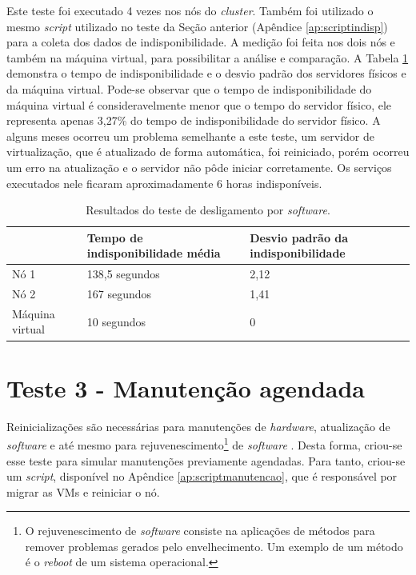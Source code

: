 Este teste foi executado 4 vezes nos nós do \textit{cluster}. Também foi utilizado o mesmo \textit{script} utilizado no teste da Seção anterior
(Apêndice \ref{ap:scriptindisp}) para a coleta dos dados de indisponibilidade. A medição foi feita nos dois nós e também na máquina virtual, para
possibilitar a análise e comparação.
A Tabela \ref{tab:teste2resultados} demonstra o tempo de indisponibilidade e o desvio padrão dos servidores físicos e da máquina virtual.
Pode-se observar que o tempo de indisponibilidade do máquina virtual é consideravelmente menor que o tempo do servidor físico, ele representa 
apenas 3,27\% do tempo de indisponibilidade do servidor físico. 
A alguns meses ocorreu um problema semelhante a este teste, um servidor de virtualização, que é atualizado de forma automática, foi reiniciado, 
porém ocorreu um erro na atualização e o servidor não pôde iniciar corretamente. Os serviços executados nele ficaram aproximadamente 
6 horas indisponíveis.

\begin{table}[h!]
\caption{Resultados do teste de desligamento por \textit{software}.}
\label{tab:teste2resultados}
\begin{center}
\begin{tabular}{|l|l|l|}\hline
 & \textbf{Tempo de indisponibilidade média} & \textbf{Desvio padrão da indisponibilidade} \\\hline
Nó 1 & 138,5 segundos & 2,12 \\\hline
Nó 2 & 167 segundos & 1,41 \\\hline
Máquina virtual & 10 segundos & 0 \\\hline
\end{tabular}
\end{center}
\end{table}


\section{Teste 3 - Manutenção agendada}

Reinicializações são necessárias para manutenções de \textit{hardware}, atualização de \textit{software} e até mesmo para 
rejuvenescimento\footnote{O rejuvenescimento de \textit{software} consiste na aplicações de métodos para remover problemas gerados pelo 
envelhecimento. Um exemplo de um método é o \textit{reboot} de um sistema operacional.} 
de \textit{software} \cite{melo2014}. Desta forma, criou-se esse teste para simular manutenções previamente agendadas. Para tanto, criou-se 
um \textit{script}, disponível no Apêndice \ref{ap:scriptmanutencao}, que é responsável por migrar as \acp{VM} e reiniciar o nó.

